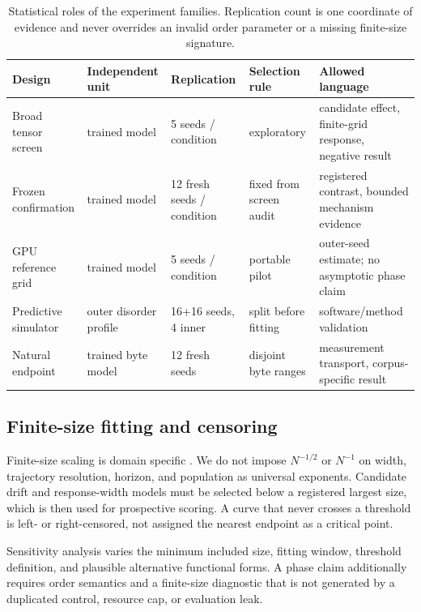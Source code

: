 \begin{table}[tbp]
\centering\small
\begin{tabularx}{\linewidth}{@{}p{23mm}p{22mm}p{19mm}p{24mm}Y@{}}
\toprule
Design & Independent unit & Replication & Selection rule & Allowed language \\
\midrule
Broad tensor screen & trained model & 5 seeds / condition & exploratory &
candidate effect, finite-grid response, negative result \\
Frozen confirmation & trained model & 12 fresh seeds / condition & fixed from
screen audit & registered contrast, bounded mechanism evidence \\
GPU reference grid & trained model & 5 seeds / condition & portable pilot &
outer-seed estimate; no asymptotic phase claim \\
Predictive simulator & outer disorder profile & 16+16 seeds, 4 inner & split
before fitting & software/method validation \\
Natural endpoint & trained byte model & 12 fresh seeds & disjoint byte ranges &
measurement transport, corpus-specific result \\
\bottomrule
\end{tabularx}
\caption{Statistical roles of the experiment families. Replication count is one
coordinate of evidence and never overrides an invalid order parameter or a
missing finite-size signature.}
\label{tab:statistical-designs}
\end{table}

\subsection{Finite-size fitting and censoring}

Finite-size scaling is domain specific
\cite{fisher1972scaling,binder1981cumulants,fisher1982firstorder}. We do not
impose $N^{-1/2}$ or $N^{-1}$ on width, trajectory resolution, horizon, and
population as universal exponents. Candidate drift and response-width models
must be selected below a registered largest size, which is then used for
prospective scoring. A curve that never crosses a threshold is left- or
right-censored, not assigned the nearest endpoint as a critical point.

Sensitivity analysis varies the minimum included size, fitting window,
threshold definition, and plausible alternative functional forms. A phase
claim additionally requires order semantics and a finite-size diagnostic that
is not generated by a duplicated control, resource cap, or evaluation leak.

